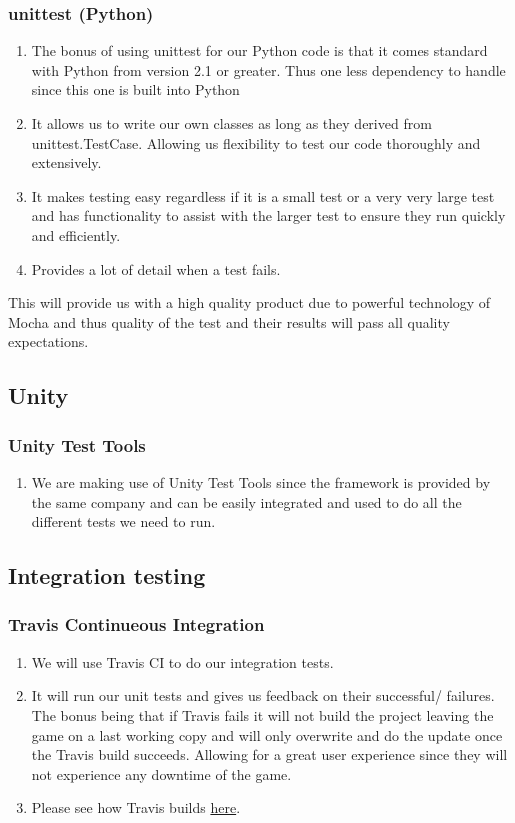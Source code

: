 \documentclass{article}
\begin{document}
		\subsubsection{unittest (Python)}
			\begin{enumerate}
				\item The bonus of using unittest for our Python code is that it comes standard with Python from version 2.1 or greater. Thus one less dependency to handle since this one is built into Python
				\item It allows us to write our own classes as long as they derived from unittest.TestCase. Allowing us flexibility to test our code thoroughly and extensively.
				\item It makes testing easy regardless if it is a small test or a very very large test and has functionality to assist with the larger test to ensure they run quickly and efficiently.
				\item Provides a lot of detail when a test fails.
			\end{enumerate}
			\noindent
			This will provide us with a high quality product due to powerful technology of Mocha and thus quality of the test and their results will pass all quality expectations.
	\subsection{Unity}
		\subsubsection{Unity Test Tools}
			\begin{enumerate}
				\item We are making use of Unity Test Tools since the framework is provided by the same company and can be easily integrated and used to do all the different tests we need to run.
			\end{enumerate}

	\subsection{Integration testing}
		\subsubsection{Travis Continueous Integration}
			\begin{enumerate}
				\item We will use Travis CI to do our integration tests.  
				\item It will run our unit tests and gives us feedback on their successful/ failures. The bonus being that if Travis fails it will not build the project leaving the game on a last working copy and will only overwrite and do the update once the Travis build succeeds. Allowing for a great user experience since they will not experience any downtime of the game. 
				\item Please see how Travis builds \href{https://travis-ci.org/KobusMarais/Cerebero/}{here}.
			\end{enumerate}
			
\end{document}
